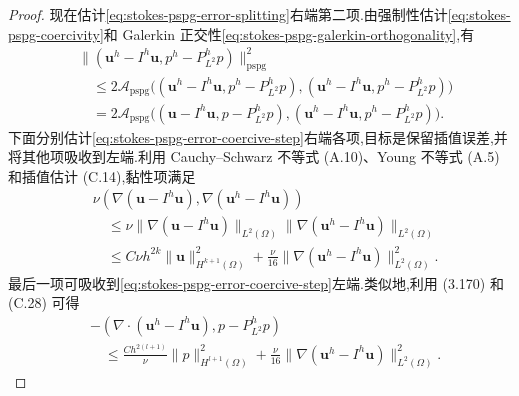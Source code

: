 \begin{proof}
现在估计\cref{eq:stokes-pspg-error-splitting}右端第二项.由强制性估计\cref{eq:stokes-pspg-coercivity}和 Galerkin 正交性\cref{eq:stokes-pspg-galerkin-orthogonality},有
\begin{equation}\label{eq:stokes-pspg-error-coercive-step}
\begin{aligned}
 &\|(\bm{u}^h-I^h\bm{u},p^h-P_{L^2}^h p)\|_{\mathrm{pspg}}^2\\
 &\quad\leq 2\mathcal{A}_{\mathrm{pspg}}\bigl((\bm{u}^h-I^h\bm{u},p^h-P_{L^2}^h p),
              (\bm{u}^h-I^h\bm{u},p^h-P_{L^2}^h p)\bigr)\\
 &\quad=2\mathcal{A}_{\mathrm{pspg}}\bigl((\bm{u}-I^h\bm{u},p-P_{L^2}^h p),
              (\bm{u}^h-I^h\bm{u},p^h-P_{L^2}^h p)\bigr).
\end{aligned}
\end{equation}
下面分别估计\cref{eq:stokes-pspg-error-coercive-step}右端各项,目标是保留插值误差,并将其他项吸收到左端.利用 Cauchy--Schwarz 不等式 (A.10)、Young 不等式 (A.5) 和插值估计 (C.14),黏性项满足
\[
\begin{aligned}
 &\nu(\nabla(\bm{u}-I^h\bm{u}),
         \nabla(\bm{u}^h-I^h\bm{u}))\\
 &\quad\leq \nu\|\nabla(\bm{u}-I^h\bm{u})\|_{L^2(\Omega)}
             \|\nabla(\bm{u}^h-I^h\bm{u})\|_{L^2(\Omega)}\\
 &\quad\leq C\nu h^{2k}\|\bm{u}\|_{H^{k+1}(\Omega)}^2
       +\frac{\nu}{16}\|\nabla(\bm{u}^h-I^h\bm{u})\|_{L^2(\Omega)}^2.
\end{aligned}
\]
最后一项可吸收到\cref{eq:stokes-pspg-error-coercive-step}左端.类似地,利用 (3.170) 和 (C.28) 可得
\[
\begin{aligned}
 &-(\nabla\cdot(\bm{u}^h-I^h\bm{u}),p-P_{L^2}^h p)\\
 &\quad\leq \frac{C h^{2(l+1)}}{\nu}\|p\|_{H^{l+1}(\Omega)}^2
  +\frac{\nu}{16}\|\nabla(\bm{u}^h-I^h\bm{u})\|_{L^2(\Omega)}^2.
\end{aligned}
\]


\end{proof}
